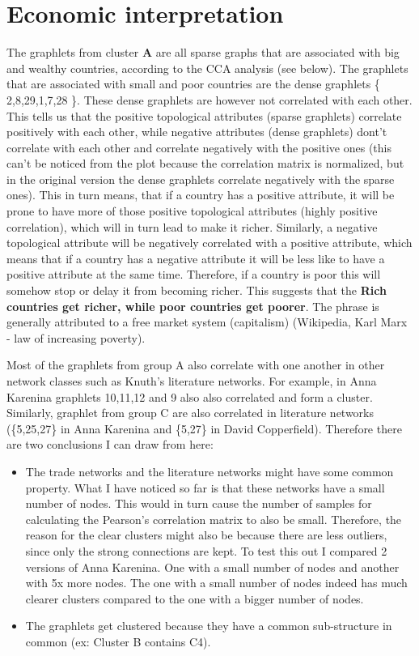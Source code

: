 \documentclass[11pt,a4paper,oneside]{report}
\begin{document}
\section*{Economic interpretation}

The graphlets from cluster \textbf{A} are all sparse graphs that are associated with big and wealthy countries, according to the CCA analysis (see below). The graphlets that are associated with small and poor countries are the dense graphlets \{ 2,8,29,1,7,28 \}. These dense graphlets are however not correlated with each other. This tells us that the positive topological attributes (sparse graphlets) correlate positively with each other, while negative attributes (dense graphlets) dont't correlate with each other and correlate negatively with the positive ones (this can't be noticed from the plot because the correlation matrix is normalized, but in the original version the dense graphlets correlate negatively with the sparse ones). This in turn means, that if a country has a positive attribute, it will be prone to have more of those positive topological attributes (highly positive correlation), which will in turn lead to make it richer. Similarly, a negative topological attribute will be negatively correlated with a positive attribute, which means that if a country has a negative attribute it will be less like to have a positive attribute at the same time. Therefore, if a country is poor this will somehow stop or delay it from becoming richer. This suggests that the \textbf{Rich countries get richer, while poor countries get poorer}. The phrase is generally attributed to a free market system (capitalism) (Wikipedia, Karl Marx - law of increasing poverty). 

Most of the graphlets from group A also correlate with one another in other network classes such as Knuth's literature networks. For example, in Anna Karenina graphlets 10,11,12 and 9 also also correlated and form a cluster. Similarly, graphlet from group C are also correlated in literature networks (\{5,25,27\} in Anna Karenina and \{5,27\} in David Copperfield). Therefore there are two conclusions I can draw from here:
\begin{itemize}
 \item The trade networks and the literature networks might have some common property. What I have noticed so far is that these networks have a small number of nodes. This would in turn cause the number of samples for calculating the Pearson's correlation matrix to also be small. Therefore, the reason for the clear clusters might also be because there are less outliers, since only the strong connections are kept. To test this out I compared 2 versions of Anna Karenina. One with a small number of nodes and another with 5x more nodes. The one with a small number of nodes indeed has much clearer clusters compared to the one with a bigger number of nodes.  
 \item The graphlets get clustered because they have a common sub-structure in common (ex: Cluster B contains C4). 
\end{itemize}
\end{document}
